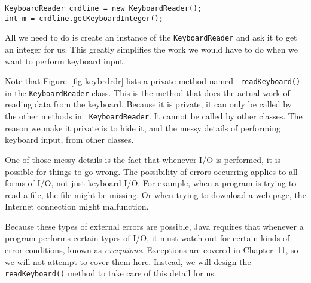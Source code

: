 \begin{jjjlisting}
\begin{lstlisting}
KeyboardReader cmdline = new KeyboardReader(); 
int m = cmdline.getKeyboardInteger();        
\end{lstlisting}
\end{jjjlisting}

\noindent All we need to do is create an instance of
the {\tt KeyboardReader} and ask it to get an integer for us. This
greatly simplifies the work we would have to do when we want to
perform keyboard input.

Note that Figure~\ref{fig-keybrdrdr} lists a private method named {\tt
readKeyboard()} in the {\tt KeyboardReader} class. This is the method
that does the actual work of reading data from the keyboard.  Because
it is private, it can only be called by the other methods in {\tt
KeyboardReader}. It cannot be called by other classes. The reason we
make it private is to hide it, and the messy details of performing
keyboard input, from other classes.

One of those messy details is the fact that whenever I/O is performed,
it is possible for things to go wrong. The possibility of errors
occurring applies to all forms of I/O, not just keyboard I/O.  For
example, when a program is trying to read a file, the file might be
missing. Or when trying to download a web page, the Internet
connection might malfunction.  

Because these types of external errors are possible, Java requires
that whenever a program performs certain types of I/O, it must watch
out for certain kinds of error conditions, known as {\em exceptions}.
Exceptions are covered in Chapter~11, so we will not attempt to cover
 them here.  Instead, we will design the
{\tt readKeyboard()} method to take care of this detail for us.


